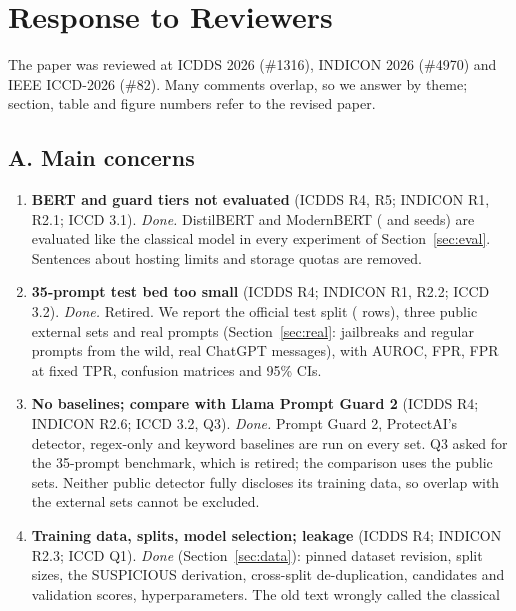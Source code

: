 \onecolumn
\section*{Response to Reviewers}
\small
The paper was reviewed at ICDDS 2026 (\#1316), INDICON 2026 (\#4970) and IEEE ICCD-2026 (\#82). Many comments
overlap, so we answer by theme; section, table and figure numbers refer to the revised paper.

\subsection*{A. Main concerns}
\begin{enumerate}\setlength{\itemsep}{1pt}
\item \textbf{BERT and guard tiers not evaluated} (ICDDS R4, R5; INDICON R1, R2.1; ICCD 3.1). \emph{Done.}
DistilBERT and ModernBERT ( and 
seeds) are evaluated like the classical model in every experiment of Section~\ref{sec:eval}. Sentences about
hosting limits and storage quotas are removed.
\item \textbf{35-prompt test bed too small} (ICDDS R4; INDICON R1, R2.2; ICCD 3.2). \emph{Done.} Retired. We
report the official test split ( rows), three public external sets and
real prompts (Section~\ref{sec:real}:  jailbreaks and
 regular prompts from the wild,  real ChatGPT
messages), with AUROC, FPR, FPR at fixed TPR, confusion matrices and 95\% CIs.
\item \textbf{No baselines; compare with Llama Prompt Guard 2} (ICDDS R4; INDICON R2.6; ICCD 3.2, Q3). \emph{Done.}
Prompt Guard 2, ProtectAI's detector, regex-only and keyword baselines are run on every set. Q3 asked for the
35-prompt benchmark, which is retired; the comparison uses the public sets. Neither public detector fully
discloses its training data, so overlap with the external sets cannot be excluded.
\item \textbf{Training data, splits, model selection; leakage} (ICDDS R4; INDICON R2.3; ICCD Q1). \emph{Done}
(Section~\ref{sec:data}): pinned dataset revision, split sizes, the SUSPICIOUS derivation, cross-split
de-duplication, candidates and validation scores, hyperparameters. The old text wrongly called the classical

\end{enumerate}
